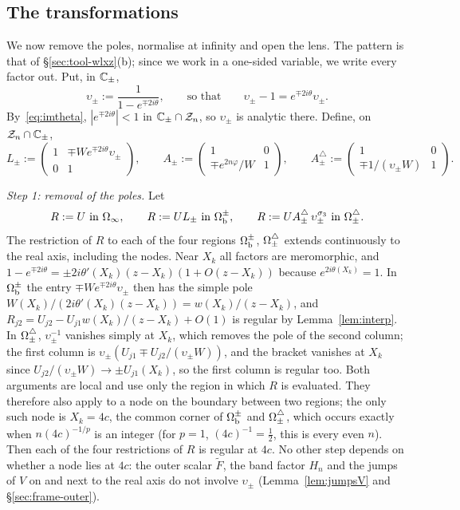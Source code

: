 \subsection{The transformations}\label{sec:frame-transf}
We now remove the poles, normalise at infinity and open the lens. The pattern is that of \S\ref{sec:tool-wlxz}(b);
since we work in a one-sided variable, we write every factor out. Put, in $\mathbb{C}_\pm$,
\begin{equation}\label{eq:upsilon}
  \upsilon_\pm:=\frac1{1-e^{\mp2i\theta}},\qquad\text{so that}\qquad \upsilon_\pm-1=e^{\mp2i\theta}\upsilon_\pm .
\end{equation}
By~\eqref{eq:imtheta}, $|e^{\mp2i\theta}|<1$ in $\mathbb{C}_\pm\cap\mathcal{Z}_n$, so $\upsilon_\pm$ is analytic there. Define,
on $\mathcal{Z}_n\cap\mathbb{C}_\pm$,
\begin{equation}\label{eq:LA}
  L_\pm:=\begin{pmatrix}1&\mp We^{\mp2i\theta}\upsilon_\pm\\0&1\end{pmatrix},\qquad
  A_\pm:=\begin{pmatrix}1&0\\\mp e^{2n\varphi}/W&1\end{pmatrix},\qquad
  A^\triangle_\pm:=\begin{pmatrix}1&0\\\mp1/(\upsilon_\pm W)&1\end{pmatrix}.
\end{equation}

\emph{Step 1: removal of the poles.} Let
\begin{equation}\label{eq:R}
  R:=U\ \text{in }\Omega_{\infty},\qquad R:=UL_\pm\ \text{in }\Omega_{\mathrm{b}}^\pm,\qquad R:=UA^\triangle_\pm\,\upsilon_\pm^{\sigma_3}\ \text{in }\Omega^{\triangle}_\pm .
\end{equation}
The restriction of $R$ to each of the four regions $\Omega_{\mathrm{b}}^\pm$, $\Omega^{\triangle}_\pm$ extends continuously to the real axis,
including the nodes. Near $X_k$ all factors are meromorphic, and $1-e^{\mp2i\theta}=\pm2i\theta'(X_k)
(z-X_k)(1+O(z-X_k))$ because $e^{2i\theta(X_k)}=1$. In $\Omega_{\mathrm{b}}^\pm$ the entry $\mp We^{\mp2i\theta}\upsilon_\pm$ then has
the simple pole $W(X_k)/(2i\theta'(X_k)(z-X_k))=w(X_k)/(z-X_k)$, and $R_{j2}=U_{j2}-U_{j1}w(X_k)/(z-X_k)+O(1)$ is
regular by Lemma~\ref{lem:interp}. In $\Omega^{\triangle}_\pm$, $\upsilon_\pm^{-1}$ vanishes simply at $X_k$, which removes the pole
of the second column; the first column is $\upsilon_\pm(U_{j1}\mp U_{j2}/(\upsilon_\pm W))$, and the bracket vanishes at
$X_k$ since $U_{j2}/(\upsilon_\pm W)\to\pm U_{j1}(X_k)$, so the first column is regular too. Both arguments are local and
use only the region in which $R$ is evaluated. They therefore also apply to a node on the boundary between two regions;
the only such node is $X_k=4c$, the common corner of $\Omega_{\mathrm{b}}^\pm$ and $\Omega^{\triangle}_\pm$, which occurs exactly when
$n(4c)^{-1/p}$ is an integer (for $p=1$, $(4c)^{-1}=\frac12$, this is every even $n$). Then each of the four restrictions
of $R$ is regular at $4c$. No other step depends on whether a node lies at $4c$: the outer scalar
$\tilde F$, the band factor $H_n$ and the jumps of $V$ on and next to the real axis do not involve $\upsilon_\pm$
(Lemma~\ref{lem:jumpsV} and \S\ref{sec:frame-outer}).

